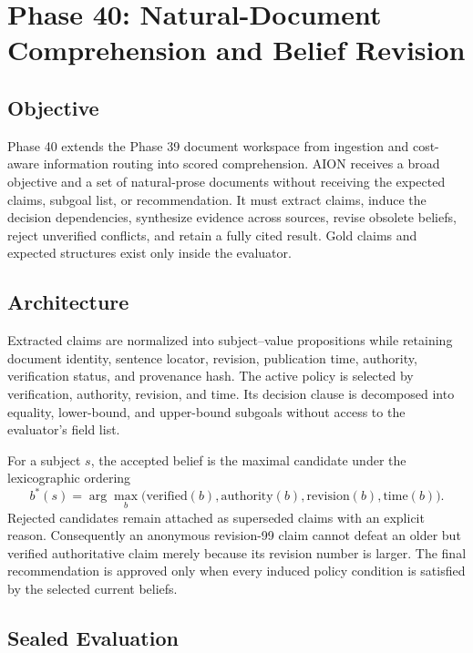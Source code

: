 \section{Phase 40: Natural-Document Comprehension and Belief Revision}
\label{sec:phase40-document-comprehension}

\subsection{Objective}

Phase 40 extends the Phase 39 document workspace from ingestion and
cost-aware information routing into scored comprehension.  AION receives a
broad objective and a set of natural-prose documents without receiving the
expected claims, subgoal list, or recommendation.  It must extract claims,
induce the decision dependencies, synthesize evidence across sources, revise
obsolete beliefs, reject unverified conflicts, and retain a fully cited result.
Gold claims and expected structures exist only inside the evaluator.

\subsection{Architecture}

Extracted claims are normalized into subject--value propositions while
retaining document identity, sentence locator, revision, publication time,
authority, verification status, and provenance hash.  The active policy is
selected by verification, authority, revision, and time.  Its decision clause
is decomposed into equality, lower-bound, and upper-bound subgoals without
access to the evaluator's field list.

For a subject \(s\), the accepted belief is the maximal candidate under the
lexicographic ordering
\[
  b^*(s)=\arg\max_b
  \bigl(
  \mathrm{verified}(b),
  \mathrm{authority}(b),
  \mathrm{revision}(b),
  \mathrm{time}(b)
  \bigr).
\]
Rejected candidates remain attached as superseded claims with an explicit
reason.  Consequently an anonymous revision-99 claim cannot defeat an older
but verified authoritative claim merely because its revision number is
larger.  The final recommendation is approved only when every induced policy
condition is satisfied by the selected current beliefs.

\subsection{Sealed Evaluation}

